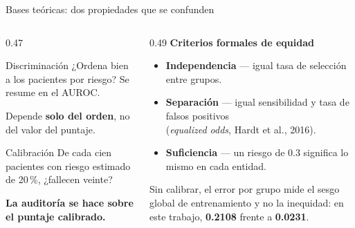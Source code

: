 \documentclass[aspectratio=169,11pt]{beamer}
\newcommand{\resalta}[1]{{\color{vino}\bfseries #1}}
\newcommand{\cifra}[1]{{\color{naranja}\bfseries #1}}
\begin{document}
\begin{frame}{Bases teóricas: dos propiedades que se confunden}
  \vspace{0.4em}
  \begin{columns}[T,onlytextwidth]
    \begin{column}{0.47\textwidth}
      \begin{block}{Discriminación}
        \small ¿Ordena bien a los pacientes por riesgo? Se resume en el AUROC.

        \vspace{0.4em}
        Depende \resalta{solo del orden}, no del valor del puntaje.
      \end{block}
      \vspace{0.5em}
      \begin{block}{Calibración}
        \small De cada cien pacientes con riesgo estimado de 20\,\%,
        ¿fallecen veinte?

        \vspace{0.4em}
        \resalta{La auditoría se hace sobre el puntaje calibrado.}
      \end{block}
    \end{column}
    \begin{column}{0.49\textwidth}
      {\bfseries Criterios formales de equidad}
      \vspace{0.4em}
      {\small
      \begin{itemize}\setlength\itemsep{0.45em}
        \item \resalta{Independencia} — igual tasa de selección entre grupos.
        \item \resalta{Separación} — igual sensibilidad y tasa de falsos
              positivos \\ {\footnotesize(\textit{equalized odds},
              Hardt et al., 2016)}.
        \item \resalta{Suficiencia} — un riesgo de 0.3 significa lo mismo en
              cada entidad.
      \end{itemize}}

      \vspace{0.6em}
      {\footnotesize\color{humo} Sin calibrar, el error por grupo mide el sesgo
      global de entrenamiento y no la inequidad: en este trabajo,
      \cifra{0.2108} frente a \cifra{0.0231}.}
    \end{column}
  \end{columns}
\end{frame}
\end{document}
